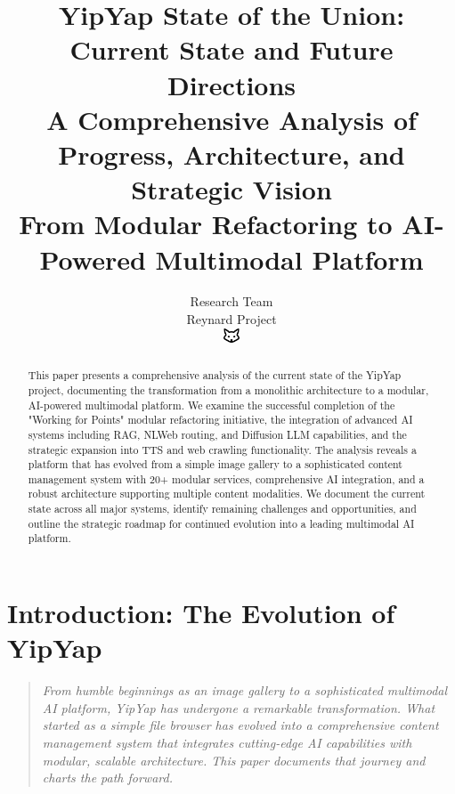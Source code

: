 \documentclass[11pt]{article}
\begin{document}
\title{\textbf{YipYap State of the Union: Current State and Future Directions} \\
\Large{A Comprehensive Analysis of Progress, Architecture, and Strategic Vision} \\
\large{From Modular Refactoring to AI-Powered Multimodal Platform}}

\author{Research Team\\
Reynard Project\\
\includegraphics[width=0.5cm]{../../shared-assets/favicon.pdf}}

\maketitle

\begin{abstract}
This paper presents a comprehensive analysis of the current state of the YipYap project, documenting the transformation from a monolithic architecture to a modular, AI-powered multimodal platform. We examine the successful completion of the "Working for Points" modular refactoring initiative, the integration of advanced AI systems including RAG, NLWeb routing, and Diffusion LLM capabilities, and the strategic expansion into TTS and web crawling functionality. The analysis reveals a platform that has evolved from a simple image gallery to a sophisticated content management system with 20+ modular services, comprehensive AI integration, and a robust architecture supporting multiple content modalities. We document the current state across all major systems, identify remaining challenges and opportunities, and outline the strategic roadmap for continued evolution into a leading multimodal AI platform.
\end{abstract}

\tableofcontents
\newpage

\section{Introduction: The Evolution of YipYap}

\begin{quote}
\emph{From humble beginnings as an image gallery to a sophisticated multimodal AI platform, YipYap has undergone a remarkable transformation. What started as a simple file browser has evolved into a comprehensive content management system that integrates cutting-edge AI capabilities with modular, scalable architecture. This paper documents that journey and charts the path forward.}
\end{quote}
\end{document}
